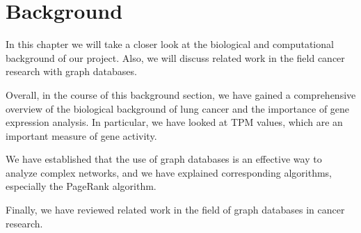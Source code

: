 \section{Background} \label{sec:background}
In this chapter we will take a closer look at the biological and computational background of our project.
Also, we will discuss related work in the field cancer research with graph databases.







Overall, in the course of this background section,
we have gained a comprehensive overview of the biological background of lung cancer and
the importance of gene expression analysis.
In particular, we have looked at TPM values, which are an important measure of gene activity.

We have established that the use of graph databases is an effective way to analyze complex networks,
and we have explained corresponding algorithms, especially the PageRank algorithm.

Finally, we have reviewed related work in the field of graph databases in cancer research.
